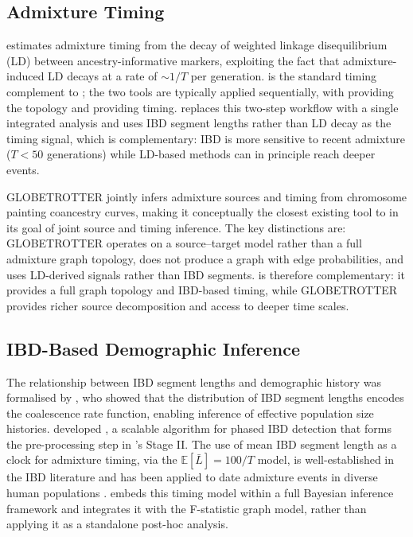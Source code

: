 \subsection*{Admixture Timing}

\alder{} \citep{Loh2013} estimates admixture timing from the decay of
weighted linkage disequilibrium (LD) between ancestry-informative markers,
exploiting the fact that admixture-induced LD decays at a rate of
$\sim\!1/T$ per generation.
\alder{} is the standard timing complement to \treemix{}; the two tools
are typically applied sequentially, with \treemix{} providing the topology
and \alder{} providing timing.
\hapgraph{} replaces this two-step workflow with a single integrated analysis
and uses IBD segment lengths rather than LD decay as the timing signal, which
is complementary: IBD is more sensitive to recent admixture ($T < 50$
generations) while LD-based methods can in principle reach deeper events.

\textsc{GLOBETROTTER} \citep{Hellenthal2014} jointly infers admixture sources
and timing from chromosome painting coancestry curves, making it conceptually
the closest existing tool to \hapgraph{} in its goal of joint source and timing
inference.
The key distinctions are: \textsc{GLOBETROTTER} operates on a source--target
model rather than a full admixture graph topology, does not produce a graph
with edge probabilities, and uses LD-derived signals rather than IBD segments.
\hapgraph{} is therefore complementary: it provides a full graph topology and
IBD-based timing, while \textsc{GLOBETROTTER} provides richer source
decomposition and access to deeper time scales.

\subsection*{IBD-Based Demographic Inference}

The relationship between IBD segment lengths and demographic history was
formalised by \citet{Palamara2012}, who showed that the distribution of IBD
segment lengths encodes the coalescence rate function, enabling inference of
effective population size histories.
\citet{Browning2020} developed \hapibd{}, a scalable algorithm for phased IBD
detection that forms the pre-processing step in \hapgraph{}'s Stage II.
The use of mean IBD segment length as a clock for admixture timing, via the
$\mathbb{E}[\bar{L}] = 100/T$ model, is well-established in the IBD literature
\citep{Browning2020} and has been applied to date admixture events in diverse
human populations \citep{Moorjani2013}.
\hapgraph{} embeds this timing model within a full Bayesian inference
framework and integrates it with the F-statistic graph model, rather than
applying it as a standalone post-hoc analysis.

